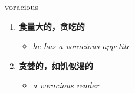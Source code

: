 
\begin{frame}
{\huge voracious}
\begin{center}
\begin{enumerate}\Large
  \item \textbf{食量大的，贪吃的}
  \begin{itemize}
    \item \em{\Large{he has a voracious appetite}}
  \end{itemize}
  \item \textbf{贪婪的，如饥似渴的}
  \begin{itemize}
    \item \em{\Large{a voracious reader}}
  \end{itemize}
\end{enumerate}
\end{center}
\end{frame}
